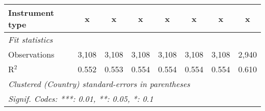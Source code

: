 \begin{table}[htbp]
\begin{tabular}{lccccccc}
      Instrument type                                                        & x             & x             & x             & x             & x             & x             & x\\  
      \midrule \emph{Fit statistics}\\
      Observations                                                           & 3,108         & 3,108         & 3,108         & 3,108         & 3,108         & 3,108         & 2,940\\  
      R$^2$                                                                  & 0.552         & 0.553         & 0.554         & 0.554         & 0.554         & 0.554         & 0.610\\  
      \midrule
      \multicolumn{8}{l}{\emph{Clustered (Country) standard-errors in parentheses}}\\
      \multicolumn{8}{l}{\emph{Signif. Codes: ***: 0.01, **: 0.05, *: 0.1}}\\
   \end{tabular}
\end{table}


